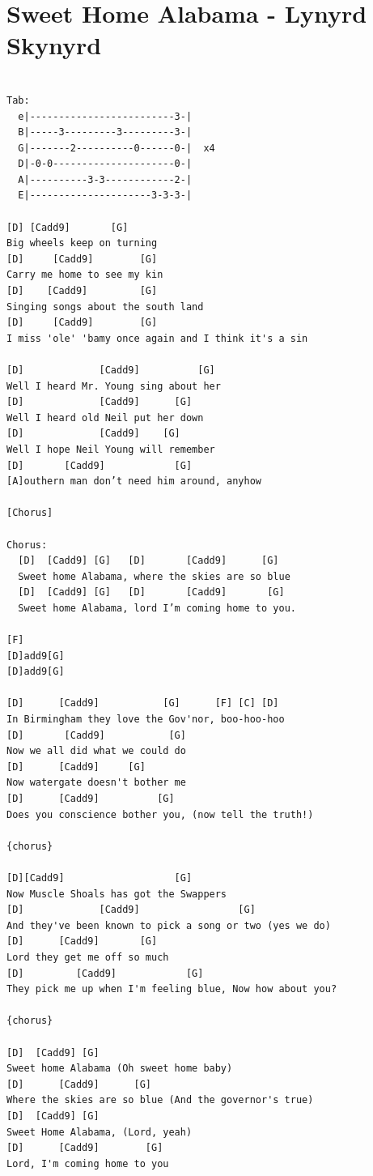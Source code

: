 \documentclass[
]{book}
\let\stdsection\section
\renewcommand\section{\clearpage\stdsection}
\begin{document}
\hypertarget{sweet-home-alabama---lynyrd-skynyrd}{%
\section{Sweet Home Alabama - Lynyrd Skynyrd}\label{sweet-home-alabama---lynyrd-skynyrd}}

\begin{verbatim}

Tab:
  e|-------------------------3-|
  B|-----3---------3---------3-|
  G|-------2----------0------0-|  x4
  D|-0-0---------------------0-|     
  A|----------3-3------------2-|
  E|---------------------3-3-3-|

[D] [Cadd9]       [G]
Big wheels keep on turning
[D]     [Cadd9]        [G]
Carry me home to see my kin
[D]    [Cadd9]         [G]
Singing songs about the south land
[D]     [Cadd9]        [G]                           
I miss 'ole' 'bamy once again and I think it's a sin

[D]             [Cadd9]          [G]
Well I heard Mr. Young sing about her
[D]             [Cadd9]      [G]
Well I heard old Neil put her down
[D]             [Cadd9]    [G]
Well I hope Neil Young will remember
[D]       [Cadd9]            [G]               
[A]outhern man don’t need him around, anyhow

[Chorus]

Chorus:
  [D]  [Cadd9] [G]   [D]       [Cadd9]      [G]        
  Sweet home Alabama, where the skies are so blue
  [D]  [Cadd9] [G]   [D]       [Cadd9]       [G]     
  Sweet home Alabama, lord I’m coming home to you.

[F]
[D]add9[G]
[D]add9[G]

[D]      [Cadd9]           [G]      [F] [C] [D]
In Birmingham they love the Gov'nor, boo-hoo-hoo
[D]       [Cadd9]           [G]
Now we all did what we could do
[D]      [Cadd9]     [G]
Now watergate doesn't bother me
[D]      [Cadd9]          [G]
Does you conscience bother you, (now tell the truth!)

{chorus}

[D][Cadd9]                   [G]
Now Muscle Shoals has got the Swappers
[D]             [Cadd9]                 [G]
And they've been known to pick a song or two (yes we do)
[D]      [Cadd9]       [G]
Lord they get me off so much
[D]         [Cadd9]            [G]   
They pick me up when I'm feeling blue, Now how about you?

{chorus}

[D]  [Cadd9] [G]     
Sweet home Alabama (Oh sweet home baby)
[D]      [Cadd9]      [G]   
Where the skies are so blue (And the governor's true)
[D]  [Cadd9] [G]
Sweet Home Alabama, (Lord, yeah)
[D]      [Cadd9]        [G]
Lord, I'm coming home to you
\end{verbatim}
\end{document}
